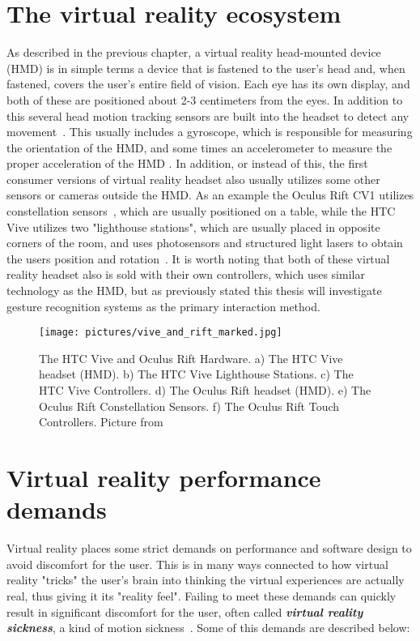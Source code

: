 
\section{The virtual reality ecosystem}
As described in the previous chapter, a virtual reality head-mounted device (HMD) is in simple terms a device that is fastened to the user's head and, when fastened, covers the
user's entire field of vision. Each eye has its own display, and both of these are positioned about 2-3 centimeters from the eyes. In addition to this several head motion
tracking sensors are built into the headset to detect any movement~\citep{POLYGON2016}. This usually includes a gyroscope, which is responsible for measuring the orientation of the
HMD, and some times an accelerometer to measure the proper acceleration of the HMD \citep{THEVERGE2016}. In addition, or instead of this, the first consumer versions of 
virtual reality headset also usually utilizes some other sensors or cameras outside the HMD. As an example the Oculus Rift CV1 utilizes constellation sensors~\cite{VRFOCUS2015}, 
which are usually positioned on a table, while the HTC Vive utilizes two "lighthouse stations", which are usually placed in opposite corners of the room, and uses photosensors and 
structured light lasers to obtain the users position and rotation~\cite{GIZMODO2015}. 
It is worth noting that both of these virtual reality headset also is sold with their own controllers, which uses similar technology as the HMD, but as previously stated this
thesis will investigate gesture recognition systems as the primary interaction method.  

\begin{figure}%
	\texttt{[image: pictures/vive\_and\_rift\_marked.jpg]}
	\caption[The HTC Vive and Oculus Rift Hardware]{The HTC Vive and Oculus Rift Hardware. 
    a) The HTC Vive headset (HMD). b) The HTC Vive Lighthouse Stations. c) The HTC Vive Controllers. d) The Oculus Rift headset (HMD). e) The Oculus Rift Constellation Sensors. 
    f) The Oculus Rift Touch Controllers. Picture from \citet{ROADTOVR2016}}
	\label{fig:vive_and_rift_marked}
\end{figure} 

\section{Virtual reality performance demands}
Virtual reality places some strict demands on performance and software design to avoid discomfort for the user. This is in many ways connected to how virtual reality "tricks" 
the user's brain into thinking the virtual experiences are actually real, thus giving it its "reality feel". Failing to meet these demands can quickly result in significant 
discomfort for the user, often called \textbf{\textit{virtual reality sickness}}, a kind of motion sickness~\citep{ARSTECHNICA2013}. Some of this demands are described below:

